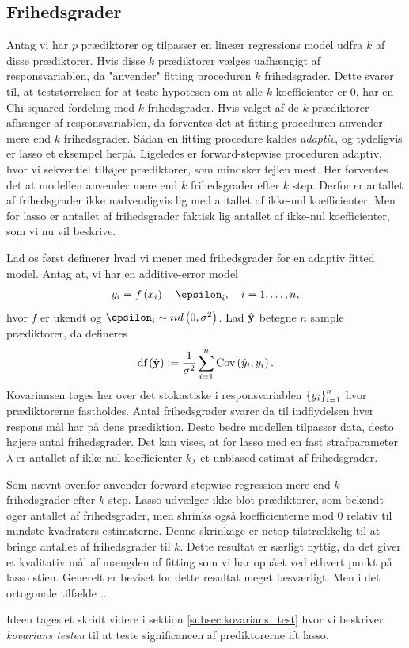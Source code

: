 \subsection{Frihedsgrader}
Antag vi har \(p\) prædiktorer og tilpasser en lineær regressions model udfra \(k\) af disse prædiktorer.
Hvis disse \(k\) prædiktorer vælges uafhængigt af responsvariablen, da "anvender" fitting proceduren \(k\) frihedsgrader.
Dette svarer til, at teststørrelsen for at teste hypotesen om at alle \(k\) koefficienter er 0, har en Chi-squared fordeling med \(k\) frihedsgrader.
%
Hvis valget af de \(k\) prædiktorer afhænger af responsvariablen, da forventes det at fitting proceduren anvender mere end \(k\) frihedsgrader. 
Sådan en fitting procedure kaldes \textit{adaptiv}, og tydeligvis er lasso et eksempel herpå.
Ligeledes er forward-stepwise proceduren adaptiv, hvor vi sekventiel tilføjer prædiktorer, som mindsker fejlen mest.
Her forventes det at modellen anvender mere end \(k\) frihedsgrader efter \(k\) step.
Derfor er antallet af frihedsgrader ikke nødvendigvis lig med antallet af ikke-nul koefficienter.
Men for lasso er antallet af frihedsgrader faktisk lig antallet af ikke-nul koefficienter, som vi nu vil beskrive.

Lad os først definerer hvad vi mener med frihedsgrader for en adaptiv fitted model. 
Antag at, vi har en additive-error model
\begin{align*}
y_i = f \del{x_i} + \epsilon_i, \quad i = 1, \ldots, n,
\end{align*}
hvor \(f\) er ukendt og \(\epsilon_i \sim iid \del{0, \sigma^2}\).
Lad \(\hat{\mathbf{y}}\) betegne \(n\) sample prædiktorer, da defineres 
\begin{align}
\text{df}\del{\hat{\y}} := \frac{1}{\sigma^2} \sum_{i=1}^n \text{Cov}\del{\hat{y}_i, y_i}. \label{eq:df_lasso}
\end{align}
Kovariansen tages her over det stokastiske i responsvariablen \(\cbr{y_i}_{i=1}^n\) hvor prædiktorerne fastholdes.
Antal frihedsgrader svarer da til indflydelsen hver respons mål har på dens prædiktion.
Desto bedre modellen tilpasser data, desto højere antal frihedsgrader.
Det kan vises, at for lasso med en fast strafparameter \(\lambda\) er antallet af ikke-nul koefficienter \(k_\lambda\) et unbiased estimat af frihedsgrader.

Som nævnt ovenfor anvender forward-stepwise regression mere end \(k\) frihedsgrader efter \(k\) step.
Lasso udvælger ikke blot prædiktorer, som bekendt øger antallet af frihedsgrader, men shrinks også koefficienterne mod 0 relativ til mindste kvadraters estimaterne.
Denne skrinkage er netop tilstrækkelig til at bringe antallet af frihedsgrader til \(k\).
Dette resultat er særligt nyttig, da det giver et kvalitativ mål af mængden af fitting som vi har opnået ved ethvert punkt på lasso stien.
Generelt er beviset for dette resultat meget besværligt.
Men i det ortogonale tilfælde ...

Ideen tages et skridt videre i sektion \ref{subsec:kovarians_test} hvor vi beskriver \textit{kovarians testen} til at teste significancen af prediktorerne ift lasso.
 